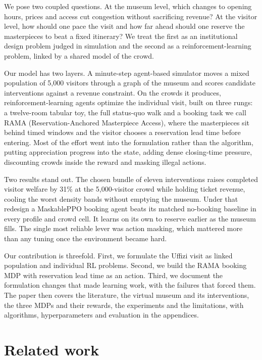 \documentclass[11pt]{article}
\begin{document}
We pose two coupled questions. At the museum level, which changes to opening hours, prices and access
cut congestion without sacrificing revenue? At the visitor level, how should one pace the visit and how
far ahead should one reserve the masterpieces to beat a fixed itinerary? We treat the first as an
institutional design problem judged in simulation and the second as a reinforcement-learning problem,
linked by a shared model of the crowd.

Our model has two layers. A minute-step agent-based simulator moves a mixed population of 5,000 visitors
through a graph of the museum and scores candidate interventions against a revenue constraint. On the
crowds it produces, reinforcement-learning agents optimize the individual visit, built on three rungs: a
twelve-room tabular toy, the full status-quo walk and a booking task we call RAMA (Reservation-Anchored
Masterpiece Access), where the masterpieces sit behind timed windows and the visitor chooses a
reservation lead time before entering. Most of the effort went into the formulation rather than the
algorithm, putting appreciation progress into the state, adding dense closing-time pressure, discounting
crowds inside the reward and masking illegal actions.

Two results stand out. The chosen bundle of eleven interventions raises completed visitor welfare by
31\% at the 5,000-visitor crowd while holding ticket revenue, cooling the worst density bands without
emptying the museum. Under that redesign a MaskablePPO booking agent beats its matched no-booking
baseline in every profile and crowd cell. It learns on its own to reserve earlier as the museum fills.
The single most reliable lever was action masking, which mattered more than any tuning once the
environment became hard.

Our contribution is threefold. First, we formulate the Uffizi visit as linked population and individual
RL problems. Second, we build the RAMA booking MDP with reservation lead time as an action. Third, we
document the formulation changes that made learning work, with the failures that forced them. The paper
then covers the literature, the virtual museum and its interventions, the three MDPs and their rewards,
the experiments and the limitations, with algorithms, hyperparameters and evaluation in the appendices.

\section{Related work}
\end{document}
